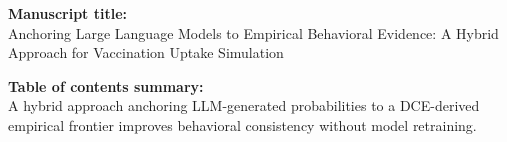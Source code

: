 \documentclass[11pt]{article}
\begin{document}
\noindent\textbf{Manuscript title:}\\
Anchoring Large Language Models to Empirical Behavioral Evidence: A Hybrid Approach for Vaccination Uptake Simulation

\vspace{0.5em}

\noindent\textbf{Table of contents summary:}\\
A hybrid approach anchoring LLM-generated probabilities to a DCE-derived empirical frontier improves behavioral consistency without model retraining.
\end{document}

